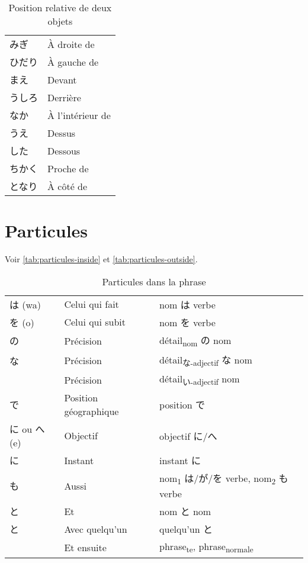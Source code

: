 \documentclass[a4paper,10pt,french,openany]{memoir}
\begin{document}
\begin{table}[h]
 \centering
 \begin{tabular}{ll}
  みぎ & À droite de \\
  ひだり & À gauche de \\
  まえ & Devant \\
  うしろ & Derrière \\
  なか & À l'intérieur de \\
  うえ & Dessus \\
  した & Dessous \\
  ちかく & Proche de \\
  となり & À côté de \\
 \end{tabular}
 \caption{Position relative de deux objets}
 \label{tab:position-relative}
\end{table}

\section{Particules}

Voir \autoref{tab:particules-inside} et \autoref{tab:particules-outside}.

\begin{table}[h]
 \centering
 \begin{tabular}{lll}
 は (wa) & Celui qui fait & nom は verbe \\
 を (o) & Celui qui subit & nom を verbe \\
 の & Précision & détail\textsubscript{nom} の nom \\
 な & Précision & détail\textsubscript{な-adjectif} な nom \\
    & Précision & détail\textsubscript{い-adjectif} nom \\
 で & Position géographique & position で \\
 に ou へ (e) & Objectif & objectif に/へ \\
 に & Instant & instant に \\
 も & Aussi & nom\textsubscript{1} は/が/を verbe, nom\textsubscript{2} も verbe \\
 と & Et & nom と nom \\
 と & Avec quelqu'un & quelqu'un と \\
    & Et ensuite & phrase\textsubscript{te}, phrase\textsubscript{normale} \\
 \end{tabular}
 \caption{Particules dans la phrase}
 \label{tab:particules-inside}
\end{table}
\end{document}
